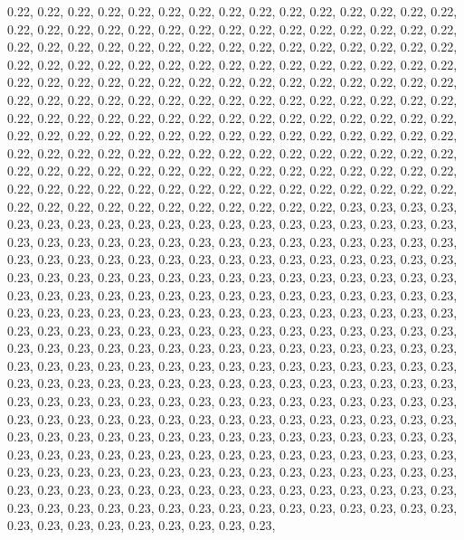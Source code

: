 \documentclass[11pt,]{article}
\begin{document}
0.22, 0.22, 0.22, 0.22, 0.22, 0.22, 0.22, 0.22, 0.22, 0.22, 0.22, 0.22,
0.22, 0.22, 0.22, 0.22, 0.22, 0.22, 0.22, 0.22, 0.22, 0.22, 0.22, 0.22,
0.22, 0.22, 0.22, 0.22, 0.22, 0.22, 0.22, 0.22, 0.22, 0.22, 0.22, 0.22,
0.22, 0.22, 0.22, 0.22, 0.22, 0.22, 0.22, 0.22, 0.22, 0.22, 0.22, 0.22,
0.22, 0.22, 0.22, 0.22, 0.22, 0.22, 0.22, 0.22, 0.22, 0.22, 0.22, 0.22,
0.22, 0.22, 0.22, 0.22, 0.22, 0.22, 0.22, 0.22, 0.22, 0.22, 0.22, 0.22,
0.22, 0.22, 0.22, 0.22, 0.22, 0.22, 0.22, 0.22, 0.22, 0.22, 0.22, 0.22,
0.22, 0.22, 0.22, 0.22, 0.22, 0.22, 0.22, 0.22, 0.22, 0.22, 0.22, 0.22,
0.22, 0.22, 0.22, 0.22, 0.22, 0.22, 0.22, 0.22, 0.22, 0.22, 0.22, 0.22,
0.22, 0.22, 0.22, 0.22, 0.22, 0.22, 0.22, 0.22, 0.22, 0.22, 0.22, 0.22,
0.22, 0.22, 0.22, 0.22, 0.22, 0.22, 0.22, 0.22, 0.22, 0.22, 0.22, 0.22,
0.22, 0.22, 0.22, 0.22, 0.22, 0.22, 0.22, 0.22, 0.22, 0.22, 0.22, 0.22,
0.22, 0.22, 0.22, 0.22, 0.22, 0.22, 0.22, 0.22, 0.22, 0.22, 0.22, 0.22,
0.22, 0.22, 0.22, 0.22, 0.22, 0.22, 0.22, 0.22, 0.22, 0.22, 0.22, 0.22,
0.22, 0.22, 0.22, 0.22, 0.22, 0.22, 0.22, 0.22, 0.23, 0.23, 0.23, 0.23,
0.23, 0.23, 0.23, 0.23, 0.23, 0.23, 0.23, 0.23, 0.23, 0.23, 0.23, 0.23,
0.23, 0.23, 0.23, 0.23, 0.23, 0.23, 0.23, 0.23, 0.23, 0.23, 0.23, 0.23,
0.23, 0.23, 0.23, 0.23, 0.23, 0.23, 0.23, 0.23, 0.23, 0.23, 0.23, 0.23,
0.23, 0.23, 0.23, 0.23, 0.23, 0.23, 0.23, 0.23, 0.23, 0.23, 0.23, 0.23,
0.23, 0.23, 0.23, 0.23, 0.23, 0.23, 0.23, 0.23, 0.23, 0.23, 0.23, 0.23,
0.23, 0.23, 0.23, 0.23, 0.23, 0.23, 0.23, 0.23, 0.23, 0.23, 0.23, 0.23,
0.23, 0.23, 0.23, 0.23, 0.23, 0.23, 0.23, 0.23, 0.23, 0.23, 0.23, 0.23,
0.23, 0.23, 0.23, 0.23, 0.23, 0.23, 0.23, 0.23, 0.23, 0.23, 0.23, 0.23,
0.23, 0.23, 0.23, 0.23, 0.23, 0.23, 0.23, 0.23, 0.23, 0.23, 0.23, 0.23,
0.23, 0.23, 0.23, 0.23, 0.23, 0.23, 0.23, 0.23, 0.23, 0.23, 0.23, 0.23,
0.23, 0.23, 0.23, 0.23, 0.23, 0.23, 0.23, 0.23, 0.23, 0.23, 0.23, 0.23,
0.23, 0.23, 0.23, 0.23, 0.23, 0.23, 0.23, 0.23, 0.23, 0.23, 0.23, 0.23,
0.23, 0.23, 0.23, 0.23, 0.23, 0.23, 0.23, 0.23, 0.23, 0.23, 0.23, 0.23,
0.23, 0.23, 0.23, 0.23, 0.23, 0.23, 0.23, 0.23, 0.23, 0.23, 0.23, 0.23,
0.23, 0.23, 0.23, 0.23, 0.23, 0.23, 0.23, 0.23, 0.23, 0.23, 0.23, 0.23,
0.23, 0.23, 0.23, 0.23, 0.23, 0.23, 0.23, 0.23, 0.23, 0.23, 0.23, 0.23,
0.23, 0.23, 0.23, 0.23, 0.23, 0.23, 0.23, 0.23, 0.23, 0.23, 0.23, 0.23,
0.23, 0.23, 0.23, 0.23, 0.23, 0.23, 0.23, 0.23, 0.23, 0.23, 0.23, 0.23,
0.23, 0.23, 0.23, 0.23, 0.23, 0.23, 0.23, 0.23, 0.23, 0.23, 0.23, 0.23,
0.23, 0.23, 0.23, 0.23, 0.23, 0.23, 0.23, 0.23, 0.23, 0.23, 0.23, 0.23,
0.23, 0.23, 0.23, 0.23, 0.23, 0.23, 0.23, 0.23, 0.23, 0.23, 0.23, 0.23,
0.23, 0.23, 0.23, 0.23, 0.23, 0.23, 0.23, 0.23, 0.23, 0.23, 0.23, 0.23,
\end{document}
